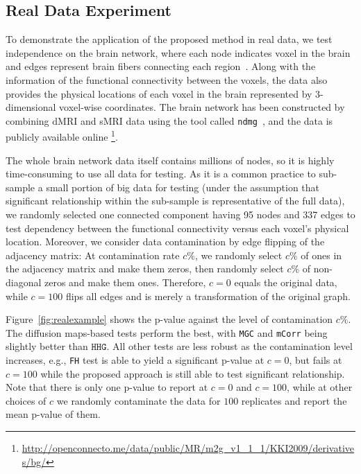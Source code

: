 \documentclass[11pt]{article}
\theoremstyle{definition}
\begin{document}
\subsection{Real Data Experiment}
\label{ssec:real}

To demonstrate the application of the proposed method in real data, we test independence on the brain network, where each node indicates voxel in the brain and edges represent brain fibers connecting each region~\cite{kiar2016ndmg}. Along with the information of the functional connectivity between the voxels, the data also provides the physical locations of each voxel in the brain represented by 3-dimensional voxel-wise coordinates. The brain network has been constructed by combining dMRI and sMRI data using the tool called \texttt{ndmg}~\cite{kiar2016science}, and the data is publicly available online \footnote{\url{http://openconnecto.me/data/public/MR/m2g_v1_1_1/KKI2009/derivatives/bg/}}.

The whole brain network data itself contains millions of nodes, so it is highly time-consuming to use all data for testing. As it is a common practice to sub-sample a small portion of big data for testing (under the assumption that significant relationship within the sub-sample is representative of the full data), we randomly selected one connected component having 95 nodes and 337 edges to test dependency between the functional connectivity versus each voxel's physical location. Moreover, we consider data contamination by edge flipping of the adjacency matrix: At contamination rate $c \%$, we randomly select $c \%$ of ones in the adjacency matrix and make them zeros, then randomly select $c \%$ of non-diagonal zeros and make them ones. Therefore, $c=0$ equals the original data, while $c=100$ flips all edges and is merely a transformation of the original graph.

Figure~\ref{fig:realexample} shows the p-value against the level of contamination $c \%$. The diffusion maps-based tests perform the best, with \texttt{MGC} and \texttt{mCorr} being slightly better than $\texttt{HHG}$. All other tests are less robust as the contamination level increases, e.g., \texttt{FH} test is able to yield a significant p-value at $c=0$, but fails at $c=100$ while the proposed approach is still able to test significant relationship. Note that there is only one p-value to report at $c=0$ and $c=100$, while at other choices of $c$ we randomly contaminate the data for $100$ replicates and report the mean p-value of them.
\end{document}

